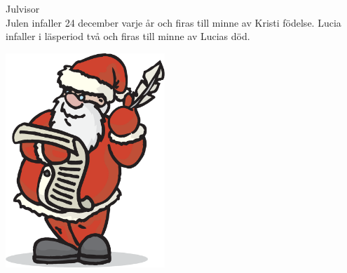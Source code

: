 \begin{flushleft}
{\Huge Julvisor\\}
{\Large
\vspace{1cm}
Julen infaller 24 december varje år och firas till minne av Kristi
födelse. Lucia infaller i läsperiod två och firas till minne av Lucias död.}
\end{flushleft}

\vspace{2cm}
\begin{center}
\includegraphics[width=6cm]{bilder/jul.eps}
\end{center}
\newpage
{}
\newpage
{}
\newpage
{}
\newpage
{}
\newpage
{}